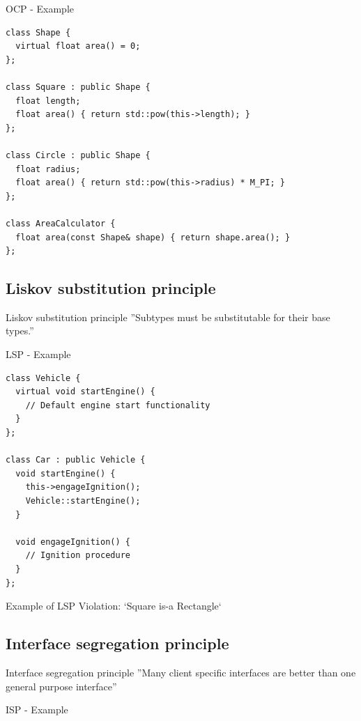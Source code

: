 \documentclass{beamer}
\begin{document}
\begin{frame}[fragile]{OCP - Example}
\begin{lstlisting}[caption=OCP Example]
class Shape {
  virtual float area() = 0;
};

class Square : public Shape {
  float length;
  float area() { return std::pow(this->length); }
};

class Circle : public Shape {
  float radius;
  float area() { return std::pow(this->radius) * M_PI; }
};

class AreaCalculator {
  float area(const Shape& shape) { return shape.area(); }
};
\end{lstlisting}
\end{frame}


\subsection{Liskov substitution principle}

\begin{frame}{Liskov substitution principle}
''Subtypes must be substitutable for their base types.''
\end{frame}

\begin{frame}[fragile]{LSP - Example}
\begin{lstlisting}[caption=LSP Example]
class Vehicle {
  virtual void startEngine() {
    // Default engine start functionality
  }
};

class Car : public Vehicle {
  void startEngine() {
    this->engageIgnition();
    Vehicle::startEngine();
  }

  void engageIgnition() {
    // Ignition procedure
  }
};
\end{lstlisting}
Example of LSP Violation: `Square is-a Rectangle`
\end{frame}


\subsection{Interface segregation principle}

\begin{frame}{Interface segregation principle}
''Many client specific interfaces are better than one general purpose
interface''
\end{frame}

\begin{frame}{ISP - Example}
\end{frame}
\end{document}
